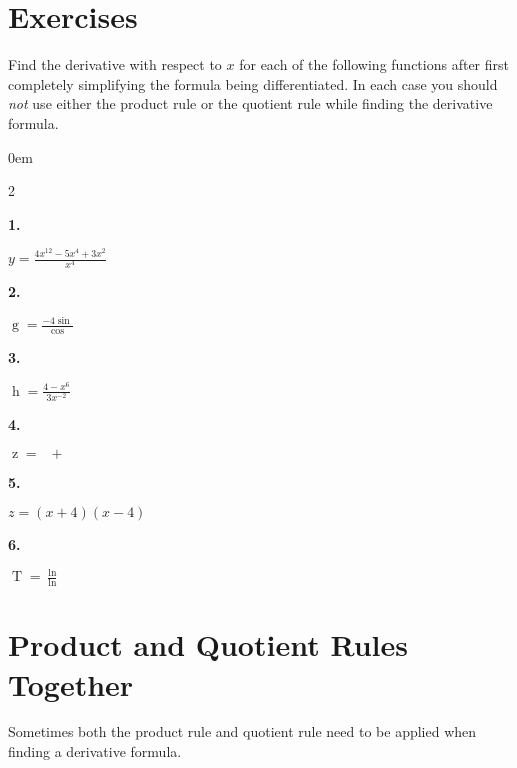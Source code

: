 \documentclass[12pt,]{book}
\theoremstyle{plain}
\theoremstyle{definition}
\numberwithin{equation}{section}
\newenvironment{exercisegroup}%
{\medskip\noindent}%
{\par\bigskip}%
\newlength{\exercisegroupindent}%
\newlength{\exercisegroupitemwidth}%
\newenvironment{exercisegrouplist}%
{\vspace{-\partopsep}%
\begin{adjustwidth}{\exercisegroupindent}{0em}}%
{\end{adjustwidth}%
\vspace{-\partopsep}%
\vspace{\baselineskip}}%
\newenvironment{exercisegroupbycol}[1]%
{\begin{exercisegrouplist}%
\vspace{-\multicolsep}%
\begin{multicols}{#1}%
\setlength{\parindent}{0em}%
\setlength{\exercisegroupitemwidth}{\linewidth}}%
{\end{multicols}%
\vspace{-\multicolsep}%
\end{exercisegrouplist}}%
\newenvironment{exercisegroupitem}[1]%
{\begin{minipage}[t]{\exercisegroupitemwidth}
\vspace{0pt}%
{\bfseries#1}%
\rule{0pt}{\baselineskip}}{\strut%
\end{minipage}%
\hspace{\columnsep}}%
\providecommand\phantomsection{}
\newcommand{\fe}[2]{\mathop{{#1}{\left(#2\right)}}}
\begin{document}
\section*{Exercises}\label{exercises-35}

\begin{exercisegroup}%
Find the derivative with respect to \(x\) for each of the following functions after first completely simplifying the formula being differentiated.  In each case you should \emph{not} use either the product rule or the quotient rule while finding the derivative formula.%
\begin{exercisegroupbycol}{2}%
\begin{exercisegroupitem}{1. }\phantomsection\hypertarget{exercise-264}{\null}
\(y=\frac{4x^{12}-5x^4+3x^2}{x^4}\)%
\end{exercisegroupitem}%
\par%
\begin{exercisegroupitem}{2. }\phantomsection\hypertarget{exercise-265}{\null}
\(\fe{g}{x}=\frac{-4\fe{\sin}{x}}{\fe{\cos}{x}}\)%
\end{exercisegroupitem}%
\par%
\begin{exercisegroupitem}{3. }\phantomsection\hypertarget{exercise-266}{\null}
\(\fe{h}{x}=\frac{4-x^6}{3x^{-2}}\)%
\end{exercisegroupitem}%
\par%
\begin{exercisegroupitem}{4. }\phantomsection\hypertarget{exercise-267}{\null}
\(\fe{z}{x}=\fe{\sin^2}{x}+\fe{\cos^2}{x}\)%
\end{exercisegroupitem}%
\par%
\begin{exercisegroupitem}{5. }\phantomsection\hypertarget{exercise-268}{\null}
\(z=(x+4)(x-4)\)%
\end{exercisegroupitem}%
\par%
\begin{exercisegroupitem}{6. }\phantomsection\hypertarget{exercise-269}{\null}
\(\fe{T}{x}=\frac{\fe{\ln}{x}}{\fe{\ln}{x^2}}\)%
\end{exercisegroupitem}%
\par%
\end{exercisegroupbycol}%
\end{exercisegroup}%
\typeout{************************************************}
\typeout{************************************************}
\section[Product and Quotient Rules Together]{Product and Quotient Rules Together}\label{section-product-and-quotient-together}
Sometimes both the product rule and quotient rule need to be applied when finding a derivative formula.%
\typeout{************************************************}
\typeout{************************************************}
\end{document}
